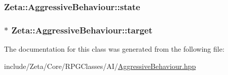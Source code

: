 \hypertarget{classZeta_1_1AggressiveBehaviour_ae0a924de0719f042bcb2f9def9a61e2b}{
\subsubsection[{state}]{ Zeta\+::\+Aggressive\+Behaviour\+::state\hspace{0.3cm}{\ttfamily [private]}}}\label{classZeta_1_1AggressiveBehaviour_ae0a924de0719f042bcb2f9def9a61e2b}
\hypertarget{classZeta_1_1AggressiveBehaviour_a7f1e06e7f51216cb7d9bb8ade9d79a47}{
\subsubsection[{target}]{$\ast$ Zeta\+::\+Aggressive\+Behaviour\+::target\hspace{0.3cm}{\ttfamily [private]}}}\label{classZeta_1_1AggressiveBehaviour_a7f1e06e7f51216cb7d9bb8ade9d79a47}


The documentation for this class was generated from the following file\+:\begin{DoxyCompactItemize}
\item 
include/\+Zeta/\+Core/\+R\+P\+G\+Classes/\+A\+I/\hyperlink{AggressiveBehaviour_8hpp}{Aggressive\+Behaviour.\+hpp}\end{DoxyCompactItemize}
